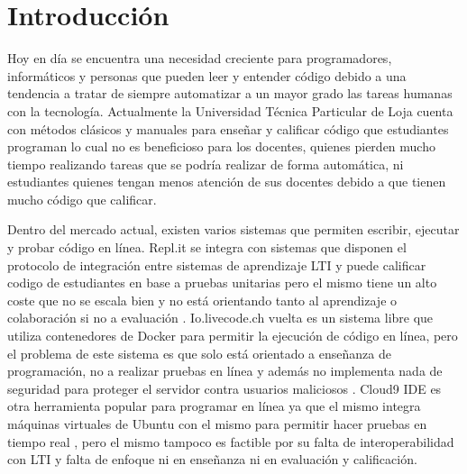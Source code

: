 
\chapter{Introducción}
\label{capitulo1}

%


\newcommand{\keyword}[1]{\textbf{#1}}
\newcommand{\tabhead}[1]{\textbf{#1}}
\newcommand{\code}[1]{\texttt{#1}}
\newcommand{\file}[1]{\texttt{\bfseries#1}}
\newcommand{\option}[1]{\texttt{\itshape#1}}


Hoy en día se encuentra una necesidad creciente para programadores, informáticos y personas que pueden leer y entender código debido a una tendencia a tratar de siempre automatizar a un mayor grado las tareas humanas con la tecnología. Actualmente la Universidad Técnica Particular de Loja cuenta con métodos clásicos y manuales para enseñar y calificar código que estudiantes programan lo cual no es beneficioso para los docentes, quienes pierden mucho tiempo realizando tareas que se podría realizar de forma automática, ni estudiantes quienes tengan menos atención de sus docentes debido a que tienen mucho código que calificar.
 
Dentro del mercado actual, existen varios sistemas que permiten escribir, ejecutar y probar código en línea. Repl.it se integra con sistemas que disponen el protocolo de integración entre sistemas de aprendizaje LTI \citep{Repl.it-Home} y puede calificar codigo de estudiantes en base a pruebas unitarias pero el mismo tiene un alto coste que no se escala bien y no está orientando tanto al aprendizaje o colaboración si no a evaluación \citep{Lopez-Jorge}. Io.livecode.ch vuelta es un sistema libre que utiliza contenedores de Docker para permitir la ejecución de código en línea, pero el problema de este sistema es que solo está orientado a enseñanza de programación, no a realizar pruebas en línea y además no implementa nada de seguridad para proteger el servidor contra usuarios maliciosos \citep{io.livecode.ch}. Cloud9 IDE es otra herramienta popular para programar en línea ya que el mismo integra máquinas virtuales de Ubuntu con el mismo para permitir hacer pruebas en tiempo real \citep{Cloud9-Home}, pero el mismo tampoco es factible por su falta de interoperabilidad con LTI y falta de enfoque ni en enseñanza ni en evaluación y calificación.
 
